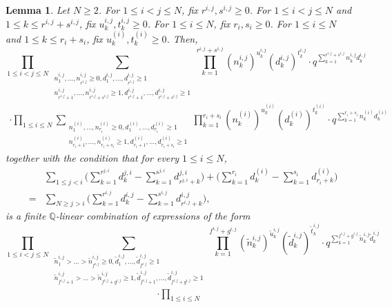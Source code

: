 \documentclass[12pt, reqno]{amsart}
\newtheorem{lemma}[theorem]{Lemma}
\theoremstyle{definition}
\theoremstyle{remark}
\numberwithin{equation}{section}
\newcommand{\Q}{ \mathbb Q }
\newcommand{\w}{\tilde}
\numberwithin{equation}{section}
\begin{document}
\begin{lemma}  \label{finite_redu1toNm>0} 
Let $N \ge 2$. For $1 \le i < j \le N$, fix $r^{i,j}, s^{i,j} \ge 0$. 
For $1 \le i < j \le N$ and $1 \le k \le r^{i,j} + s^{i,j}$, 
fix $u_k^{i,j}, t_k^{i,j} \ge 0$. 
For $1 \le i \le N$, fix $r_i, s_i \ge 0$. For $1 \le i \le N$
and $1 \le k \le r_i + s_i$, fix $u_k^{(i)}, t_k^{(i)} \ge 0$. Then, 
$$
\prod_{1 \le i < j \le N}
\sum_{\substack{n_1^{i,j}, \ldots, n_{r^{i,j}}^{i,j} \ge 0, 
    d_1^{i,j}, \ldots, d_{r^{i,j}}^{i,j} \ge 1\\
    n_{r^{i,j}+1}^{i,j}, \ldots, n_{r^{i,j}+s^{i,j}}^{i,j} \ge 1, 
    d_{r^{i,j}+1}^{i,j}, \ldots, d_{r^{i,j}+s^{i,j}}^{i,j} \ge 1}}
  \prod_{k=1}^{r^{i,j}+s^{i,j}} (n_k^{i,j})^{u_k^{i,j}}
    (d_k^{i,j})^{t_k^{i,j}} 
\cdot q^{\sum_{k=1}^{r^{i,j}+s^{i,j}} n_k^{i,j} d_k^{i,j}}
$$
\begin{eqnarray}    \label{finite_redu1toNm>0.0}
\cdot \prod_{1 \le i \le N}
\sum_{\substack{n_1^{(i)}, \ldots, n_{r_i}^{(i)} \ge 0, 
    d_1^{(i)}, \ldots, d_{r_i}^{(i)} \ge 1\\
    n_{r_i+1}^{(i)}, \ldots, n_{r_i+s_i}^{(i)} \ge 1,
    d_{r_i+1}^{(i)}, \ldots, d_{r_i+s_i}^{(i)} \ge 1}}
  \prod_{k=1}^{r_i+s_i} (n_k^{(i)})^{u_k^{(i)}} (d_k^{(i)})^{t_k^{(i)}}
\cdot q^{\sum_{k=1}^{r_i+s_i} n_k^{(i)} d_k^{(i)}}
\end{eqnarray}    
together with the condition that for every $1 \le i \le N$,
\begin{eqnarray*}
& &\sum_{1 \le j < i} \bigg (\sum_{k=1}^{r^{j,i}} d_k^{j,i} 
    - \sum_{k=1}^{s^{j,i}} d_{r^{j,i}+k}^{j,i} \bigg )
  + \bigg (\sum_{k=1}^{r_i} d_k^{(i)} 
    - \sum_{k=1}^{s_i} d_{r_i+k}^{(i)} \bigg )    \\
&=&\sum_{N \ge j > i} \bigg (\sum_{k=1}^{r^{i,j}} d_k^{i,j} 
    - \sum_{k=1}^{s^{i,j}} d_{r^{i,j}+k}^{i,j} \bigg ),
\end{eqnarray*}
is a finite $\Q$-linear combination of expressions of the form
$$
\prod_{1 \le i < j \le N}
\sum_{\substack{\w n_1^{i,j} > \ldots > \w n_{f^{i,j}}^{i,j} \ge 0, 
    \w d_1^{i,j}, \ldots, \w d_{f^{i,j}}^{i,j} \ge 1\\
    \w n_{f^{i,j}+1}^{i,j} > \ldots > \w n_{f^{i,j}+g^{i,j}}^{i,j} \ge 1, 
    \w d_{f^{i,j}+1}^{i,j}, \ldots, \w d_{f^{i,j}+g^{i,j}}^{i,j} \ge 1}}
\prod_{k=1}^{f^{i,j}+g^{i,j}} (\w n_k^{i,j})^{\w u_k^{i,j}}
    (\w d_k^{i,j})^{\w t_k^{i,j}} 
\cdot q^{\sum_{k=1}^{f^{i,j}+g^{i,j}} \w n_k^{i,j} \w d_k^{i,j}}
$$
\begin{eqnarray}    \label{finite_redu1toNm>0.01}
\cdot \prod_{1 \le i \le N}

\end{eqnarray}
\end{lemma}
\end{document}
